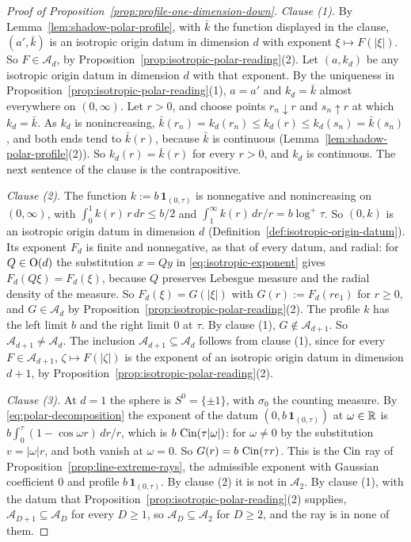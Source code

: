 \begin{proof}[Proof of Proposition~\ref{prop:profile-one-dimension-down}]
\emph{Clause (1).} By Lemma~\ref{lem:shadow-polar-profile}, with $\bar k$ the function displayed in
the clause, $(a',\bar k)$ is an isotropic origin datum in dimension $d$ with exponent
$\xi \mapsto F(|\xi|)$. So $F \in \mathcal{A}_d$, by
Proposition~\ref{prop:isotropic-polar-reading}(2). Let $(a,k_d)$ be any isotropic origin datum in
dimension $d$ with that exponent. By the uniqueness in Proposition~\ref{prop:isotropic-polar-reading}(1),
$a = a'$ and $k_d = \bar k$ almost everywhere on $(0,\infty)$. Let $r > 0$, and choose points
$r_n \downarrow r$ and $s_n \uparrow r$ at which $k_d = \bar k$. As $k_d$ is nonincreasing,
$\bar k(r_n) = k_d(r_n) \le k_d(r) \le k_d(s_n) = \bar k(s_n)$, and both ends tend to
$\bar k(r)$, because $\bar k$ is continuous (Lemma~\ref{lem:shadow-polar-profile}(2)). So
$k_d(r) = \bar k(r)$ for every $r > 0$, and $k_d$ is continuous. The next sentence of the clause
is the contrapositive.

\emph{Clause (2).} The function $k := b\,\mathbf 1_{(0,\tau)}$ is nonnegative and nonincreasing
on $(0,\infty)$, with $\int_0^1 k(r)\,r\,dr \le b/2$ and
$\int_1^\infty k(r)\,dr/r = b\log^+\tau$. So $(0,k)$ is an isotropic origin datum in dimension
$d$ (Definition~\ref{def:isotropic-origin-datum}). Its exponent $F_d$ is finite and nonnegative, as that
of every datum, and radial: for
$Q \in \mathrm{O}(d)$ the substitution $x = Qy$ in \ref{eq:isotropic-exponent} gives
$F_d(Q\xi) = F_d(\xi)$, because $Q$ preserves Lebesgue measure and the radial density of the
\Levy{} measure. So $F_d(\xi) = G(|\xi|)$ with $G(r) := F_d(re_1)$ for $r \ge 0$, and
$G \in \mathcal{A}_d$ by Proposition~\ref{prop:isotropic-polar-reading}(2). The profile $k$ has the
left limit $b$ and the right limit $0$ at $\tau$. By clause (1), $G \notin \mathcal{A}_{d+1}$.
So $\mathcal{A}_{d+1} \ne \mathcal{A}_d$. The inclusion
$\mathcal{A}_{d+1} \subseteq \mathcal{A}_d$ follows from clause (1), since for every
$F \in \mathcal{A}_{d+1}$, $\zeta \mapsto F(|\zeta|)$ is the exponent of an isotropic origin datum
in dimension $d + 1$, by Proposition~\ref{prop:isotropic-polar-reading}(2).

\emph{Clause (3).} At $d = 1$ the sphere is $S^0 = \{\pm1\}$, with $\sigma_0$ the counting
measure. By \ref{eq:polar-decomposition} the exponent of the datum
$(0, b\,\mathbf 1_{(0,\tau)})$ at $\omega \in \mathbb{R}$ is
$b\int_0^\tau(1 - \cos\omega r)\,dr/r$, which is $b\,\operatorname{Cin}(\tau|\omega|)$: for $\omega \ne 0$ by
the substitution $v = |\omega| r$, and both vanish at $\omega = 0$. So
$G(r) = b\,\operatorname{Cin}(\tau r)$.
This is the $\operatorname{Cin}$ ray of Proposition~\ref{prop:line-extreme-rays}, the admissible exponent with
Gaussian coefficient $0$ and profile $b\,\mathbf 1_{(0,\tau)}$. By clause (2) it is not in
$\mathcal{A}_2$. By clause (1), with the datum that
Proposition~\ref{prop:isotropic-polar-reading}(2) supplies,
$\mathcal{A}_{D+1} \subseteq \mathcal{A}_D$ for every $D \ge 1$, so
$\mathcal{A}_D \subseteq \mathcal{A}_2$ for $D \ge 2$, and the ray is in none of them.
\end{proof}

